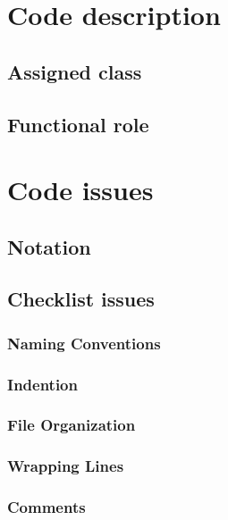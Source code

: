\documentclass[11pt,a4paper]{report}
\begin{document}


\thispagestyle{empty}
\tableofcontents
\cleardoublepage
{}
\pagestyle{fancy}

\chapter{Code description}
\section{Assigned class}
\section{Functional role}
\chapter{Code issues}
\section{Notation}
\section{Checklist issues}
\subsection{Naming Conventions}
\subsection{Indention}
\subsection{File Organization}
\subsection{Wrapping Lines}
\subsection{Comments}
\end{document}
